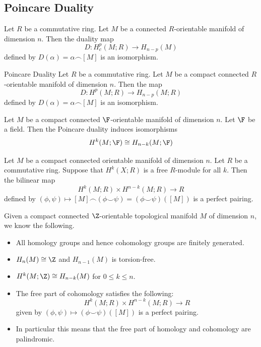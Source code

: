 \documentclass[a4paper]{article}
\begin{document}
\subsection{Poincare Duality}
\begin{prp}{}{} Let $R$ be a commutative ring. Let $M$ be a connected $R$-orientable manifold of dimension $n$. Then the duality map $$D:H_c^p(M;R)\to H_{n-p}(M)$$ defined by $D(\alpha)=\alpha\frown[M]$ is an isomorphism. 
\end{prp}

\begin{thm}{Poincare Duality}{} Let $R$ be a commutative ring. Let $M$ be a compact connected $R$-orientable manifold of dimension $n$. Then the map $$D:H^p(M;R)\to H_{n-p}(M;R)$$ defined by $D(\alpha)=\alpha\frown[M]$ is an isomorphism. 
\end{thm}

\begin{crl}{}{} Let $M$ be a compact connected $\F$-orientable manifold of dimension $n$. Let $\F$ be a field. Then the Poincare duality induces isomorphisms $$H^k(M;\F)\cong H_{n-k}(M;\F)$$
\end{crl}

\begin{prp}{}{} Let $M$ be a compact connected orientable manifold of dimension $n$. Let $R$ be a commutative ring. Suppose that $H^k(X;R)$ is a free $R$-module for all $k$. Then the bilinear map $$H^k(M;R)\times H^{n-k}(M;R)\to R$$ defined by $(\phi,\psi)\mapsto[M]\frown(\phi\smile\psi)=(\phi\smile\psi)([M])$ is a perfect pairing. 
\end{prp}

Given a compact connected $\Z$-orientable topological manifold $M$ of dimension $n$, we know the following. 
\begin{itemize}
\item All homology groups and hence cohomology groups are finitely generated. 
\item $H_n(M)\cong\Z$ and $H_{n-1}(M)$ is torsion-free. 
\item $H^k(M;\Z)\cong H_{n-k}(M)$ for $0\leq k\leq n$. 
\item The free part of cohomology satisfies the following: $$H^k(M;R)\times H^{n-k}(M;R)\to R$$ given by $(\phi,\psi)\mapsto(\phi\smile\psi)([M])$ is a perfect pairing. 
\item In particular this means that the free part of homology and cohomology are palindromic. 
\end{itemize}
\end{document}
